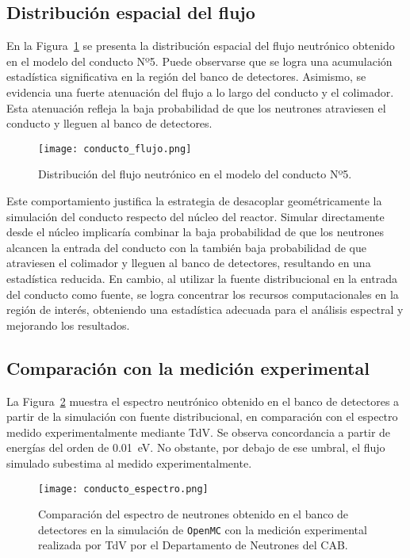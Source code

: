 \subsection{Distribución espacial del flujo}

En la Figura~\ref{fig:conducto-flujo} se presenta la distribución espacial del flujo neutrónico obtenido en el modelo del conducto Nº5. Puede observarse que se logra una acumulación estadística significativa en la región del banco de detectores. Asimismo, se evidencia una fuerte atenuación del flujo a lo largo del conducto y el colimador. Esta atenuación refleja la baja probabilidad de que los neutrones atraviesen el conducto y lleguen al banco de detectores.

\begin{figure}[h]
\centering
\texttt{[image: conducto\_flujo.png]}
\caption{Distribución del flujo neutrónico en el modelo del conducto Nº5.}
\label{fig:conducto-flujo}
\end{figure}

Este comportamiento justifica la estrategia de desacoplar geométricamente la simulación del conducto respecto del núcleo del reactor. Simular directamente desde el núcleo implicaría combinar la baja probabilidad de que los neutrones alcancen la entrada del conducto con la también baja probabilidad de que atraviesen el colimador y lleguen al banco de detectores, resultando en una estadística reducida. En cambio, al utilizar la fuente distribucional en la entrada del conducto como fuente, se logra concentrar los recursos computacionales en la región de interés, obteniendo una estadística adecuada para el análisis espectral y mejorando los resultados.

\subsection{Comparación con la medición experimental}

La Figura~\ref{fig:conducto-espectro} muestra el espectro neutrónico obtenido en el banco de detectores a partir de la simulación con fuente distribucional, en comparación con el espectro medido experimentalmente mediante TdV. Se observa concordancia a partir de energías del orden de 0.01~eV. No obstante, por debajo de ese umbral, el flujo simulado subestima al medido experimentalmente.

\begin{figure}[h]
\centering
\texttt{[image: conducto\_espectro.png]}
\caption{Comparación del espectro de neutrones obtenido en el banco de detectores en la simulación de \texttt{OpenMC} con la medición experimental realizada por TdV por el Departamento de Neutrones del CAB.}
\label{fig:conducto-espectro}
\end{figure}

